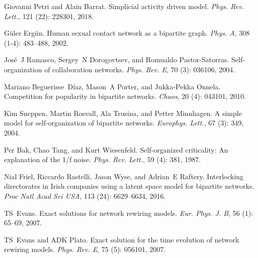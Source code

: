Giovanni Petri and Alain Barrat.
\newblock Simplicial activity driven model.
\newblock \emph{Phys. Rev. Lett.}, 121 (22): 228301, 2018.

G{\"u}ler Erg{\"u}n.
\newblock Human sexual contact network as a bipartite graph.
\newblock \emph{Phys. A}, 308 (1-4): 483--488, 2002.

Jos{\'e}~J Ramasco, Sergey~N Dorogovtsev, and Romualdo {Pastor-Satorras}.
\newblock Self-organization of collaboration networks.
\newblock \emph{Phys. Rev. E}, 70 (3): 036106, 2004.

Mariano Beguerisse~D{\'i}az, Mason~A Porter, and Jukka-Pekka Onnela.
\newblock Competition for popularity in bipartite networks.
\newblock \emph{Chaos}, 20 (4): 043101, 2010.

Kim Sneppen, Martin Rosvall, Ala Trusina, and Petter Minnhagen.
\newblock A simple model for self-organization of bipartite networks.
\newblock \emph{Europhys. Lett.}, 67 (3): 349, 2004.

Per Bak, Chao Tang, and Kurt Wiesenfeld.
\newblock Self-organized criticality: {{An}} explanation of the 1/f noise.
\newblock \emph{Phys. Rev. Lett.}, 59 (4): 381, 1987.

Nial Friel, Riccardo Rastelli, Jason Wyse, and Adrian~E Raftery.
\newblock Interlocking directorates in {{Irish}} companies using a latent space
model for bipartite networks.
\newblock \emph{Proc Natl Acad Sci USA}, 113 (24):
6629--6634, 2016.

TS~Evans.
\newblock Exact solutions for network rewiring models.
\newblock \emph{Eur. Phys. J. B}, 56 (1): 65--69, 2007.

TS~Evans and ADK Plato.
\newblock Exact solution for the time evolution of network rewiring models.
\newblock \emph{Phys. Rev. E}, 75 (5): 056101, 2007.

